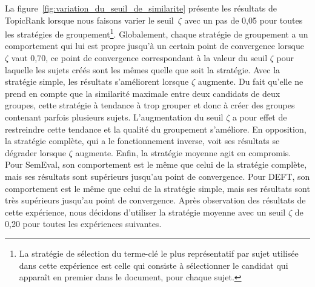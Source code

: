         La figure~\ref{fig:variation_du_seuil_de_similarite} présente les
        résultats de TopicRank lorsque nous faisons varier le seuil~$\zeta$ avec
        un pas de 0,05 pour toutes les stratégies de groupement\footnote{La
        stratégie de sélection du terme-clé le plus représentatif par sujet
        utilisée dans cette expérience est celle qui consiste à sélectionner
        le candidat qui apparaît en premier dans le document, pour chaque
        sujet.}.
        Globalement, chaque stratégie de groupement a un comportement qui lui
        est propre jusqu'à un certain point de convergence lorsque $\zeta$ vaut
        0,70, ce point de convergence correspondant à la valeur du seuil $\zeta$
        pour laquelle les sujets créés sont les mêmes quelle que soit la
        stratégie. Avec la stratégie simple, les résultats s'améliorent lorsque
        $\zeta$ augmente. Du fait qu'elle ne prend en compte que la similarité
        maximale entre deux candidats de deux groupes, cette stratégie à
        tendance à trop grouper et donc à créer des groupes contenant parfois
        plusieurs sujets. L'augmentation du seuil $\zeta$ a pour effet de
        restreindre cette tendance et la qualité du groupement s'améliore. En
        opposition, la stratégie complète, qui a le fonctionnement inverse, voit
        ses résultats se dégrader lorsque $\zeta$ augmente. Enfin, la stratégie
        moyenne agit en compromis. Pour SemEval, son comportement est le même
        que celui de la stratégie complète, mais ses résultats sont supérieurs
        jusqu'au point de convergence. Pour DEFT, son comportement est le même
        que celui de la stratégie simple, mais ses résultats sont très
        supérieurs jusqu'au point de convergence.
        Après observation des résultats de cette expérience, nous décidons
        d'utiliser la stratégie moyenne avec un seuil $\zeta$ de 0,20 pour
        toutes les expériences suivantes.

